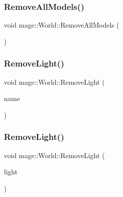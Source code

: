 \hypertarget{classmage_1_1_world_af3bae7b62192de9edda5e0567b73be93}{}\label{classmage_1_1_world_af3bae7b62192de9edda5e0567b73be93} 
\subsubsection{\texorpdfstring{Remove\+All\+Models()}{RemoveAllModels()}}
{\footnotesize\ttfamily void mage\+::\+World\+::\+Remove\+All\+Models (\begin{DoxyParamCaption}{ }\end{DoxyParamCaption})}

\hypertarget{classmage_1_1_world_a06f60650aa7992f44167043d1aa2e576}{}\label{classmage_1_1_world_a06f60650aa7992f44167043d1aa2e576} 
\subsubsection{\texorpdfstring{Remove\+Light()}{RemoveLight()}\hspace{0.1cm}{\footnotesize\ttfamily [1/2]}}
{\footnotesize\ttfamily void mage\+::\+World\+::\+Remove\+Light (\begin{DoxyParamCaption}\item[{const string \&}]{name }\end{DoxyParamCaption})}

\hypertarget{classmage_1_1_world_ab2bca0a737500b2d78b39e6cbafd61d0}{}\label{classmage_1_1_world_ab2bca0a737500b2d78b39e6cbafd61d0} 
\subsubsection{\texorpdfstring{Remove\+Light()}{RemoveLight()}\hspace{0.1cm}{\footnotesize\ttfamily [2/2]}}
{\footnotesize\ttfamily void mage\+::\+World\+::\+Remove\+Light (\begin{DoxyParamCaption}\item[{\hyperlink{namespacemage_a1e01ae66713838a7a67d30e44c67703e}{Shared\+Ptr}$<$ \hyperlink{structmage_1_1_point_light}{Point\+Light} $>$}]{light }\end{DoxyParamCaption})}

